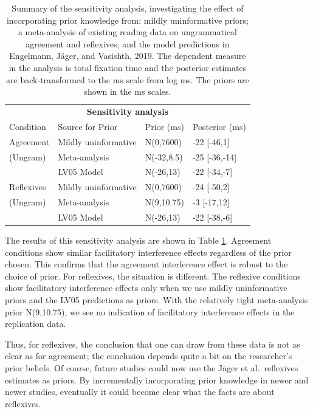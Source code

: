 \documentclass{cambridge7A}\usepackage[]{graphicx}\usepackage[]{color}
\begin{document}
\begin{table}[!htbp]
\begin{center}
\begin{tabular}{llll}
\multicolumn{4}{c}{\textbf{Sensitivity analysis}}\\
Condition & Source for Prior & Prior (ms) & Posterior (ms) \\
\hline
Agreement  & Mildly uninformative & N(0,7600) & -22 [-46,1]\\
(Ungram) & Meta-analysis  & N(-32,8.5) & -25 [-36,-14]\\
  & LV05 Model   &  N(-26,13) & -22 [-34,-7]\\
\hline                            
Reflexives  & Mildly uninformative & N(0,7600) & -24 [-50,2] \\
(Ungram) & Meta-analysis & N(9,10.75) & -3 [-17,12]\\ 
  & LV05 Model & N(-26,13) &  -22 [-38,-6]\\
 \hline                            
 \end{tabular}
\end{center}
\caption{Summary of the sensitivity analysis, investigating the effect of incorporating prior knowledge from: mildly uninformative priors; a meta-analysis of existing reading data on ungrammatical agreement and reflexives; and  the model predictions in Engelmann, J\"ager, and Vasishth, 2019. The dependent measure in the analysis is total fixation time and the posterior estimates are back-transformed to the ms scale from log ms. The priors are shown in the ms scales.}\label{tab:sensitivityanalysis}
\end{table}%

The results of this sensitivity analysis are shown in Table \ref{tab:sensitivityanalysis}.  Agreement conditions show similar facilitatory interference effects regardless of the prior chosen. 
This confirms that the agreement interference effect is robust to the choice of prior. For reflexives, the situation is different. 
The reflexive conditions show  facilitatory interference effects only when we use mildly uninformative priors and the LV05 predictions as priors.  With the relatively tight meta-analysis prior N(9,10.75), we see no indication of facilitatory interference effects in the replication data. 

Thus, for reflexives, the conclusion that one can draw from these data is not as clear as for agreement; the conclusion  depends quite a bit on the researcher's prior beliefs. Of course, future studies could now use the J\"ager et al.\ reflexives estimates as priors. By incrementally incorporating prior knowledge in newer and newer studies, eventually it could become clear what the facts are about reflexives.  
\end{document}
